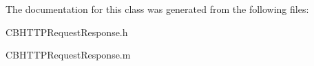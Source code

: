 The documentation for this class was generated from the following files\+:\begin{DoxyCompactItemize}
\item 
C\+B\+H\+T\+T\+P\+Request\+Response.\+h\item 
C\+B\+H\+T\+T\+P\+Request\+Response.\+m\end{DoxyCompactItemize}
